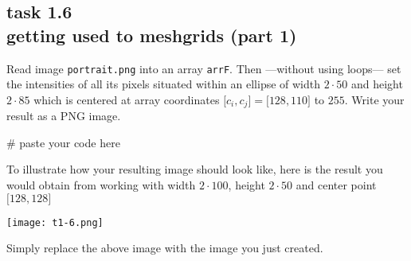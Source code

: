 
\subsection*{task 1.6 \\[1ex] getting used to meshgrids (part 1)}

Read image \texttt{portrait.png} into an array \texttt{arrF}. Then ---without using  loops--- set the intensities of all its pixels situated within an ellipse of width $2 \cdot 50$ and height $2 \cdot 85$ which is centered at array coordinates $\bigl[ c_i, c_j \bigr] = \bigl[ 128, 110 \bigr]$ to $255$. Write your result as a PNG image. \\[1ex]
\begin{python}
# paste your code here

\end{python}



\vspace{1cm}
To illustrate how your resulting image should look like, here is the result you would obtain from working with width $2 \cdot 100$, height $2 \cdot 50$ and center point $\bigl[ 128, 128 \bigr]$
\begin{center}
\texttt{[image: t1-6.png]} 
\end{center}
Simply replace the above image with the image you just created.






